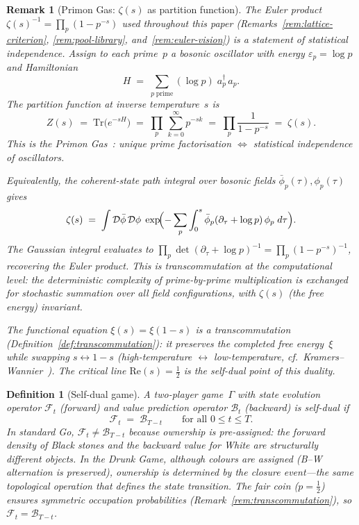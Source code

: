 \documentclass[11pt,a4paper]{article}
\newtheorem{definition}[theorem]{Definition}
\newtheorem{remark}[theorem]{Remark}
\newcommand{\cF}{\mathcal{F}}
\newcommand{\cB}{\mathcal{B}}
\begin{document}
\begin{remark}[Primon Gas: $\zeta(s)$ as partition function]%
\label{rem:primon-gas}
The Euler product
$\zeta(s)^{-1} = \prod_p(1-p^{-s})$
used throughout this paper
(Remarks~\ref{rem:lattice-criterion},
\ref{rem:pool-library},
and~\ref{rem:euler-vision})
is a statement of statistical independence.
Assign to each prime~$p$ a bosonic oscillator with energy
$\varepsilon_p = \log p$ and Hamiltonian
\[
  H \;=\; \sum_{p\;\mathrm{prime}} (\log p)\;
  a_p^\dagger\, a_p.
\]
The partition function at inverse temperature~$s$ is
\[
  Z(s)
  \;=\; \mathrm{Tr}\bigl(e^{-sH}\bigr)
  \;=\; \prod_{p}\,\sum_{k=0}^{\infty} p^{-sk}
  \;=\; \prod_{p} \frac{1}{1 - p^{-s}}
  \;=\; \zeta(s).
\]
This is the \emph{Primon Gas}~\cite{Julia90}:
unique prime factorisation
$\Leftrightarrow$
statistical independence of oscillators.

Equivalently, the coherent-state path integral over
bosonic fields $\bar\phi_p(\tau), \phi_p(\tau)$ gives
\[
  \zeta(s)
  \;=\; \int \mathcal{D}\bar\phi\,\mathcal{D}\phi\;
  \exp\!\Bigl(-\sum_{p}\int_{0}^{s}
  \bar\phi_p(\partial_\tau + \log p)\,\phi_p\;d\tau\Bigr).
\]
The Gaussian integral evaluates to
$\prod_p \det(\partial_\tau + \log p)^{-1}
= \prod_p(1-p^{-s})^{-1}$,
recovering the Euler product.
This is transcommutation at the computational level:
the deterministic complexity of prime-by-prime
multiplication is exchanged for stochastic summation
over all field configurations, with $\zeta(s)$
(the free energy) invariant.

The functional equation
$\xi(s) = \xi(1-s)$
is a transcommutation
(Definition~\ref{def:transcommutation}):
it preserves the completed free energy~$\xi$
while swapping $s \leftrightarrow 1-s$
(high-temperature $\leftrightarrow$ low-temperature,
cf.\ Kramers--Wannier~\cite{KW41}).
The critical line $\mathrm{Re}(s) = \tfrac{1}{2}$
is the self-dual point of this duality.
\end{remark}

\begin{definition}[Self-dual game]\label{def:self-dual}
A two-player game~$\Gamma$ with state evolution operator
$\cF_t$ (forward) and value prediction operator
$\cB_t$ (backward) is \emph{self-dual} if
\[
  \cF_t \;=\; \cB_{T-t}
  \qquad \text{for all } 0 \leq t \leq T.
\]
In standard Go,
$\cF_t \neq \cB_{T-t}$ because ownership is pre-assigned:
the forward density of Black stones and the backward
value for White are structurally different objects.
In the Drunk Game, although colours are assigned (B--W
alternation is preserved), ownership is determined by the
closure event---the same topological operation that defines
the state transition.
The fair coin ($p = \tfrac{1}{2}$) ensures symmetric
occupation probabilities
(Remark~\ref{rem:transcommutation}),
so $\cF_t = \cB_{T-t}$.
\end{definition}
\end{document}
